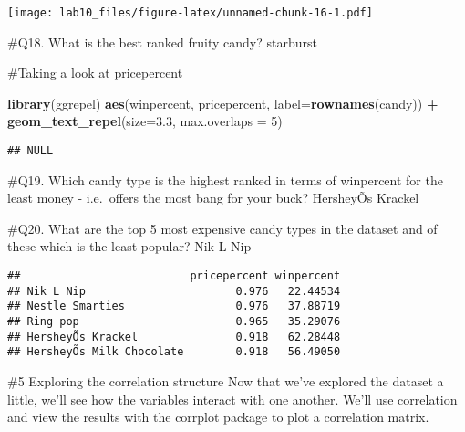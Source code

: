 \documentclass[
]{article}
\newenvironment{Shaded}{\begin{snugshade}}{\end{snugshade}}
\newcommand{\DataTypeTok}[1]{\textcolor[rgb]{0.13,0.29,0.53}{#1}}
\newcommand{\DecValTok}[1]{\textcolor[rgb]{0.00,0.00,0.81}{#1}}
\newcommand{\FloatTok}[1]{\textcolor[rgb]{0.00,0.00,0.81}{#1}}
\newcommand{\KeywordTok}[1]{\textcolor[rgb]{0.13,0.29,0.53}{\textbf{#1}}}
\newcommand{\NormalTok}[1]{#1}
\newcommand{\OperatorTok}[1]{\textcolor[rgb]{0.81,0.36,0.00}{\textbf{#1}}}
\newcommand{\OtherTok}[1]{\textcolor[rgb]{0.56,0.35,0.01}{#1}}
\newcommand{\StringTok}[1]{\textcolor[rgb]{0.31,0.60,0.02}{#1}}
\begin{document}
\texttt{[image: lab10\_files/figure-latex/unnamed-chunk-16-1.pdf]}

\#Q18. What is the best ranked fruity candy? starburst

\#Taking a look at pricepercent

\begin{Shaded}
\begin{Highlighting}[]
\KeywordTok{library}\NormalTok{(ggrepel)}
\KeywordTok{aes}\NormalTok{(winpercent, pricepercent, }\DataTypeTok{label=}\KeywordTok{rownames}\NormalTok{(candy)) }\OperatorTok{+}\StringTok{ }
\StringTok{  }\KeywordTok{geom_text_repel}\NormalTok{(}\DataTypeTok{size=}\FloatTok{3.3}\NormalTok{, }\DataTypeTok{max.overlaps =} \DecValTok{5}\NormalTok{)}
\end{Highlighting}
\end{Shaded}

\begin{verbatim}
## NULL
\end{verbatim}

\#Q19. Which candy type is the highest ranked in terms of winpercent for
the least money - i.e.~offers the most bang for your buck? HersheyÕs
Krackel

\#Q20. What are the top 5 most expensive candy types in the dataset and
of these which is the least popular? Nik L Nip

\begin{Shaded}
\end{Shaded}

\begin{verbatim}
##                          pricepercent winpercent
## Nik L Nip                       0.976   22.44534
## Nestle Smarties                 0.976   37.88719
## Ring pop                        0.965   35.29076
## HersheyÕs Krackel               0.918   62.28448
## HersheyÕs Milk Chocolate        0.918   56.49050
\end{verbatim}

\#5 Exploring the correlation structure Now that we've explored the
dataset a little, we'll see how the variables interact with one another.
We'll use correlation and view the results with the corrplot package to
plot a correlation matrix.
\end{document}

